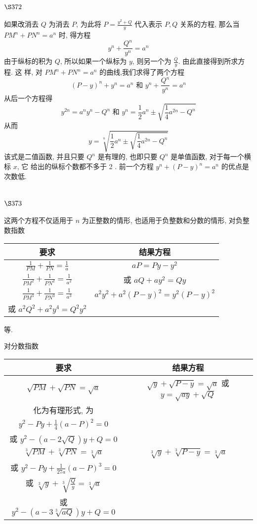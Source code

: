 \section{$\S 372$}
如果改消去 $Q$ 为消去 $P$, 为此将 $P=\frac{y^{2}+Q}{y}$ 代入表示 $P, Q$ 关系的方程, 那么当 $P M^{n}+P N^{n}=a^{n}$ 时, 得方程
\[
y^{n}+\frac{Q^{n}}{y^{n}}=a^{n}
\]
由于纵标的积为 $Q$, 所以如果一个纵标为 $y$, 则另一个为 $\frac{Q}{y}$. 由此直接得到所求方程. 这 样, 对 $P M^{n}+P N^{n}=a^{n}$ 的曲线,我们求得了两个方程
\[
(P-y)^{n}+y^{n}=a^{n} \text { 和 } y^{n}+\frac{Q^{n}}{y^{n}}=a^{n}
\]
从后一个方程得
\[
y^{2 n}=a^{n} y^{n}-Q^{n} \text { 和 } y^{n}=\frac{1}{2} a^{n} \pm \sqrt{\frac{1}{4} a^{2 n}-Q^{n}}
\]
从而
\[
y=\sqrt[n]{\frac{1}{2} a^{n} \pm \sqrt{\frac{1}{4} a^{2 n}-Q^{n}}}
\]
该式是二值函数, 并且只要 $Q^{n}$ 是有理的, 也即只要 $Q^{n}$ 是单值函数, 对于每一个横标 $x$, 它 给出的纵标个数都不多于 2 . 前一个方程 $y^{n}+(P-y)^{n}=a^{n}$ 的优点是次数低.

\section{$\S 373$}

这两个方程不仅适用于 $n$ 为正整数的情形, 也适用于负整数和分数的情形, 对负整 数指数

\begin{tabular}{c|c}
\hline 要求 & 结果方程 \\
\hline$\frac{1}{P M}+\frac{1}{P N}=\frac{1}{a}$ & $a P=P y-y^{2}$ \\
\hline$\frac{1}{P M^{2}}+\frac{1}{P N^{2}}=\frac{1}{a^{2}}$ & 或 $a Q+a y^{2}=Q y$ \\
\hline$\frac{1}{P M^{3}}+\frac{1}{P N^{3}}=\frac{1}{a^{3}}$ & $a^{2} y^{2}+a^{2}(P-y)^{2}=y^{2}(P-y)^{2}$ \\
或 $a^{2} Q^{2}+a^{2} y^{4}=Q^{2} y^{2}$ \\
\hline
\end{tabular}

等. 

对分数指数

\begin{tabular}{c|c}
\hline 要求 & 结果方程 \\
\hline$\sqrt{P M}+\sqrt{P N}=\sqrt{a}$ & $\sqrt{y}+\sqrt{P-y}=\sqrt{a}$ 或 $y=\sqrt{a y}+\sqrt{Q}$ \\
化为有理形式, 为 \\
$y^{2}-P y+\frac{1}{4}(a-P)^{2}=0$ \\
或 $y^{2}-(a-2 \sqrt{Q}) y+Q=0$ \\
$\sqrt[3]{P M}+\sqrt[3]{P N}=\sqrt[3]{a}$ & $\sqrt[3]{y}+\sqrt[3]{P-y}=\sqrt[3]{a}$ \\
或 $y^{2}-P y+\frac{1}{27 a}(a-P)^{3}=0$ \\
或 $\sqrt[3]{y}+\sqrt[3]{\frac{Q}{y}}=\sqrt[3]{a}$ \\
或 $y^{2}-(a-3 \sqrt[3]{a Q}) y+Q=0$ \\
\hline
\end{tabular}

